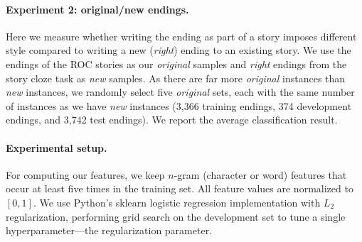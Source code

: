 \documentclass[11pt,a4paper]{article}
\newcommand{\resolved}[1]{}
\newcommand{\shortv}[1]{}
\newcommand{\roy}[1]{{\color{orange}\textsc{[#1 --rs]}}}
\newcommand{\nascomment}[1]{{\color{blue}\textsc{[#1 --nas]}}}
\renewcommand{\roy}[1]{{\color{orange}[#1 --rs]}}
\renewcommand{\roy}[1]{#1}
\renewcommand{\nascomment}[1]{}
\begin{document}
\paragraph{Experiment 2: original/new endings.}

Here we measure whether writing the ending as part of a
story imposes different style compared to writing a new ({\it right}) ending to an existing story.
We use the endings of the ROC stories as our {\it original} samples and {\it right} endings from the story cloze task   \resolved{\nascomment{if you're using the test examples as
  training data, what are you using for test? and development?  I would have thought
  you'd follow the same pattern as above ... }}as {\it new} samples.
As there are far more {\it original} instances than {\it new}
instances, we randomly select five  {\it original} sets, each with the same number of
instances  \resolved{\nascomment{(give the number in parentheses, for train/dev/test)} }as we have
\emph{new} instances (3,366 training endings, 374 development endings, and 3,742 test endings).
We report the average classification result.

\shortv{
\roy{\paragraph{Experiment 3: original/wrong endings.}
For completeness, we measure the extent to which our classifier can discriminate between {\it original} and {\it wrong} endings. We replicate Experiment 2, this time replacing {\it right} endings with {\it wrong} ones.}}

\paragraph{Experimental setup.}
\shortv{In both experiments, we add a \textsc{start} symbol at the beginning
of each sentence.\footnote{99\% of all sentences end with a period
  or an exclamation mark, so we do not add a \textsc{stop} symbol.}}
For computing our features, we keep $n$-gram (character or word) features that occur at least five times in the training set.
All feature values are normalized to $[0, 1]$.\shortv{
For the POS features, we tag all endings with the Spacy POS tagger.\footnote{\url{http://spacy.io/}}}
We use  Python's sklearn logistic regression implementation \shortv{\cite{scikit-learn} }with $L_2$
regularization, performing grid search on the development set to
tune a single hyperparameter---the regularization parameter.   \resolved{\nascomment{any other hyperparameters?  if
  not, say this is the only one.  else explain what they are.}}
\end{document}
